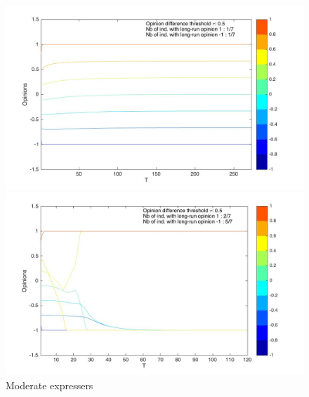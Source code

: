 \documentclass{article}
\begin{document}
\begin{figure}
\centering
  \label{ fig7} 
  \hspace{-2.9cm}
  \begin{minipage}[c]{0.65\textwidth}
    \centering
    \includegraphics[scale=0.22]{img/moderate.jpg} 
  \end{minipage}%
  \begin{minipage}[c]{0.4\textwidth}
    \centering
    \includegraphics[scale=0.22]{img/nonmoderate.jpg} 
  \end{minipage} 
  \caption{Moderate expressers}
  \label{nonmoderate}
  \end{figure}
  
\end{document}
